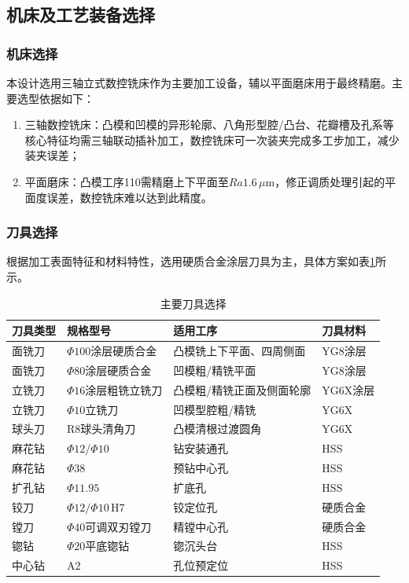\documentclass{xautCADreport}
\begin{document}
\subsection{机床及工艺装备选择}

\subsubsection{机床选择}

本设计选用三轴立式数控铣床作为主要加工设备，辅以平面磨床用于最终精磨。主要选型依据如下：

\begin{enumerate}
  \item 三轴数控铣床：凸模和凹模的异形轮廓、八角形型腔/凸台、花瓣槽及孔系等核心特征均需三轴联动插补加工，数控铣床可一次装夹完成多工步加工，减少装夹误差；
  \item 平面磨床：凸模工序110需精磨上下平面至$Ra1.6\,\mu\mathrm{m}$，修正调质处理引起的平面度误差，数控铣床难以达到此精度。
\end{enumerate}

\subsubsection{刀具选择}

根据加工表面特征和材料特性，选用硬质合金涂层刀具为主，具体方案如表\ref{tab:tool_selection}所示。

\begin{table}[H]
  \centering
  \caption{主要刀具选择}
  \label{tab:tool_selection}
  \small
  \begin{tabular}{llp{4.5cm}l}
    \toprule
    刀具类型 & 规格型号 & 适用工序 & 刀具材料 \\
    \midrule
    面铣刀 & $\Phi100$涂层硬质合金 & 凸模铣上下平面、四周侧面 & YG8涂层 \\
    面铣刀 & $\Phi80$涂层硬质合金 & 凹模粗/精铣平面 & YG8涂层 \\
    立铣刀 & $\Phi16$涂层粗铣立铣刀 & 凸模粗/精铣正面及侧面轮廓 & YG6X涂层 \\
    立铣刀 & $\Phi10$立铣刀 & 凹模型腔粗/精铣 & YG6X \\
    球头刀 & R8球头清角刀 & 凸模清根过渡圆角 & YG6X \\
    麻花钻 & $\Phi12/\Phi10$ & 钻安装通孔 & HSS \\
    麻花钻 & $\Phi38$ & 预钻中心孔 & HSS \\
    扩孔钻 & $\Phi11.95$ & 扩底孔 & HSS \\
    铰刀 & $\Phi12/\Phi10\,\mathrm{H7}$ & 铰定位孔 & 硬质合金 \\
    镗刀 & $\Phi40$可调双刃镗刀 & 精镗中心孔 & 硬质合金 \\
    锪钻 & $\Phi20$平底锪钻 & 锪沉头台 & HSS \\
    中心钻 & A2 & 孔位预定位 & HSS \\
    \bottomrule
  \end{tabular}
\end{table}
\end{document}
